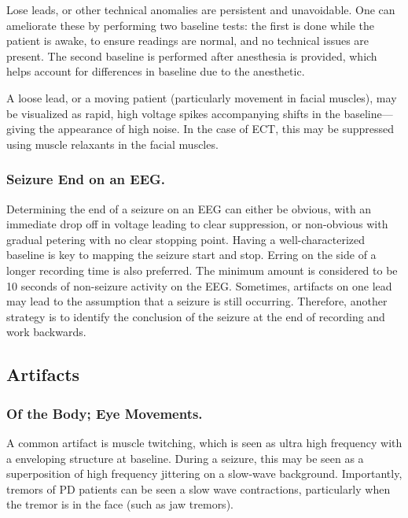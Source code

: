 Lose leads, or other technical anomalies are persistent and unavoidable. One can ameliorate these by performing two baseline tests: the first is done while the patient is awake, to ensure readings are normal, and no technical issues are present. The second baseline is performed after anesthesia is provided, which helps account for differences in baseline due to the anesthetic.\newline

A loose lead, or a moving patient (particularly movement in facial muscles), may be visualized as rapid, high voltage spikes accompanying shifts in the baseline---giving the appearance of high noise. In the case of ECT, this may be suppressed using muscle relaxants in the facial muscles. 

\subsubsection{Seizure End on an EEG.}

Determining the end of a seizure on an EEG can either be obvious, with an immediate drop off in voltage leading to clear suppression, or non-obvious with gradual petering with no clear stopping point. Having a well-characterized baseline is key to mapping the seizure start and stop. Erring on the side of a longer recording time is also preferred. The minimum amount is considered to be 10 seconds of non-seizure activity on the EEG. Sometimes, artifacts on one lead may lead to the assumption that a seizure is still occurring. Therefore, another strategy is to identify the conclusion of the seizure at the end of recording and work backwards. 

\subsection{Artifacts}

\subsubsection{Of the Body; Eye Movements.}

A common artifact is muscle twitching, which is seen as ultra high frequency with a enveloping structure at baseline. During a seizure, this may be seen as a superposition of high frequency jittering on a slow-wave background. Importantly, tremors of PD patients can be seen a slow wave contractions, particularly when the tremor is in the face (such as jaw tremors). \newline

